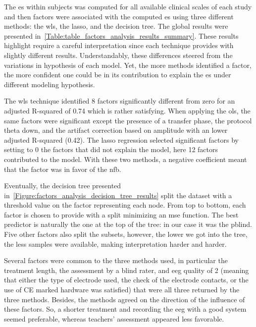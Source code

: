The \gls{es} within subjects was computed for all available clinical scales of each study and then factors were 
associated with the computed \gls{es} using three different methods: the \gls{wls}, the \gls{lasso}, and the decision tree. 
The global results were presented in~\ref{Table:table_factors_analysis_results_summary}. These results highlight require a 
careful interpretation since each technique provides with slightly different results. Understandably, these differences 
steered from the variations in hypothesis of each model. Yet, the more methods identified a factor, the more confident 
one could be in its contribution to explain the \gls{es} under different modeling hypothesis.

The \gls{wls} technique identified 8 factors significantly different from zero for an adjusted R-squared of 0.74
which is rather satisfying. When applying the \gls{ols}, the same factors were significant except the presence of 
a transfer phase, the protocol theta down, and the artifact correction based on amplitude with an lower adjusted R-squared 
(0.42). The \gls{lasso} regression selected significant factors by setting to 0 the factors that did not explain the model, 
here 12 factors contributed to the model. With these two methods, a negative coefficient meant that the factor was in favor 
of the \gls{nfb}.

Eventually, the decision tree presented in~\ref{Figure:factors_analysis_decision_tree_results} split the dataset
with a threshold value on the factor representing each node. From top to bottom, each factor is chosen to provide with a
split minimizing an \gls{mse} function. The best predictor is naturally the one at the top of the tree: in our case it was 
the \gls{pblind}. Five other factors also split the subsets, however, the lower we got into the tree, the less samples were 
available, making interpretation harder and harder.  

Several factors were common to the three methods used, in particular the treatment length, the assessment 
by a blind rater, and \gls{eeg} quality of 2 (meaning that either the type of electrode used, the check of the electrode 
contacts, or the use of CE marked hardware was satisfied) that were all three returned by the three methods. Besides, 
the methods agreed on the direction of the influence of these factors. So, a shorter treatment and recording the \gls{eeg} 
with a good system seemed preferable, whereas teachers' assessment appeared less favorable.

